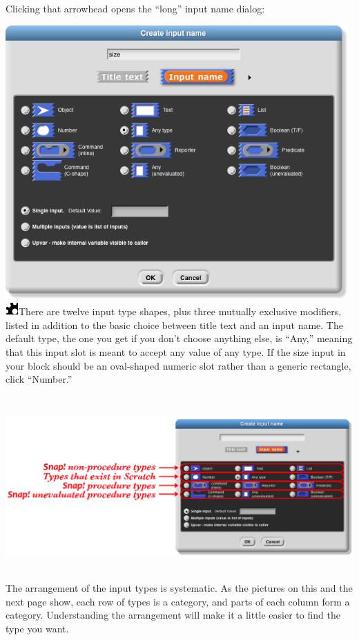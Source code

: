 Clicking that arrowhead opens the ``long'' input name dialog:

\includegraphics[width=5.17083in,height=4.13542in]{media/image657.png}\includegraphics[width=0.19792in,height=0.19792in]{media/image658.png}There
are twelve input type shapes, plus three mutually exclusive modifiers,
listed in addition to the basic choice between title text and an input
name. The default type, the one you get if you don't choose anything
else, is ``Any,'' meaning that this input slot is meant to accept any
value of any type. If the size input in your block should be an
oval-shaped numeric slot rather than a generic rectangle, click
``Number.''

\includegraphics[width=6.82222in,height=2.75694in]{media/image659.png}The
arrangement of the input types is systematic. As the pictures on this
and the next page show, each row of types is a category, and parts of
each column form a category. Understanding the arrangement will make it
a little easier to find the type you want.


